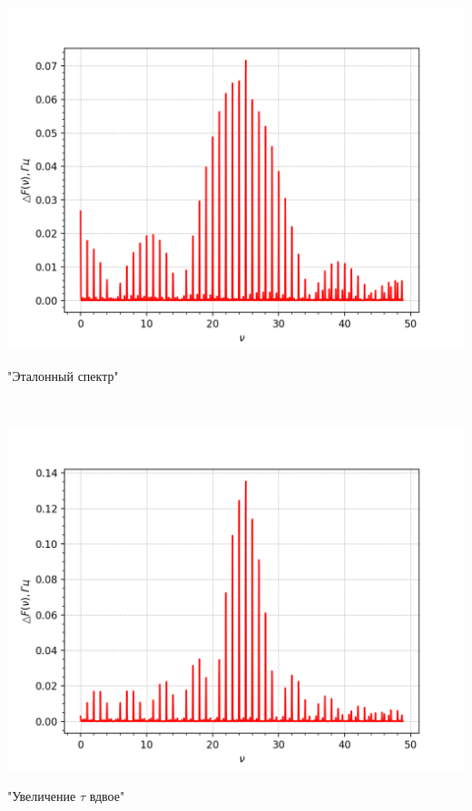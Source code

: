 \begin{minipage}{0.44\textwidth}
\includegraphics[width=\linewidth]{4.png}\\
\begin{center}
"Эталонный спектр"
\end{center}
\end{minipage}
\begin{minipage}{0.1\textwidth}
\ \ \ \ \ \ \Rightarrow
\end{minipage}
\begin{minipage}{0.44\textwidth}
\includegraphics[width=\linewidth]{5.png}\\
\begin{center}
"Увеличение $\tau$ вдвое"
\end{center}
\end{minipage}

